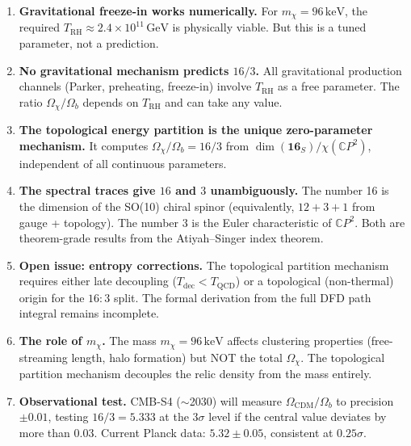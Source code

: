 \documentclass[11pt]{article}
\theoremstyle{definition}
\theoremstyle{remark}
\newcommand{\CP}{\mathbb{C}P}
\newcommand{\keV}{\,\mathrm{keV}}
\newcommand{\GeV}{\,\mathrm{GeV}}
\begin{document}
\begin{enumerate}
  \item \textbf{Gravitational freeze-in works numerically.} For
    $m_\chi = 96\keV$, the required $T_\mathrm{RH} \approx 2.4 \times 10^{11}\GeV$
    is physically viable. But this is a tuned parameter, not a prediction.

  \item \textbf{No gravitational mechanism predicts $16/3$.} All gravitational
    production channels (Parker, preheating, freeze-in) involve $T_\mathrm{RH}$
    as a free parameter. The ratio $\Omega_\chi/\Omega_b$ depends on $T_\mathrm{RH}$
    and can take any value.

  \item \textbf{The topological energy partition is the unique zero-parameter
    mechanism.} It computes $\Omega_\chi/\Omega_b = 16/3$ from
    $\dim(\mathbf{16}_S)/\chi(\CP^2)$, independent of all continuous parameters.

  \item \textbf{The spectral traces give $16$ and $3$ unambiguously.}
    The number 16 is the dimension of the SO(10) chiral spinor (equivalently,
    $12 + 3 + 1$ from gauge + topology). The number 3 is the Euler characteristic
    of $\CP^2$. Both are theorem-grade results from the Atiyah--Singer index theorem.

  \item \textbf{Open issue: entropy corrections.} The topological partition
    mechanism requires either late decoupling ($T_\mathrm{dec} < T_\mathrm{QCD}$)
    or a topological (non-thermal) origin for the $16:3$ split. The formal
    derivation from the full DFD path integral remains incomplete.

  \item \textbf{The role of $m_\chi$.} The mass $m_\chi = 96\keV$ affects
    clustering properties (free-streaming length, halo formation) but NOT
    the total $\Omega_\chi$. The topological partition mechanism decouples
    the relic density from the mass entirely.

  \item \textbf{Observational test.} CMB-S4 ($\sim$2030) will measure
    $\Omega_\mathrm{CDM}/\Omega_b$ to precision $\pm 0.01$, testing $16/3 = 5.333$
    at the $3\sigma$ level if the central value deviates by more than 0.03.
    Current Planck data: $5.32 \pm 0.05$, consistent at $0.25\sigma$.
\end{enumerate}
\end{document}
